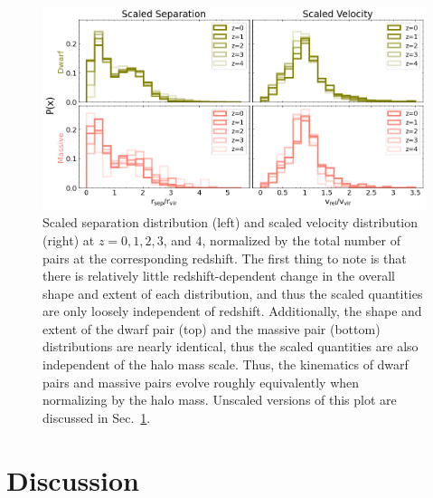 \documentclass[twocolumn]{aastex631}
\begin{document}
\begin{figure}[htp]
  \centering
  \includegraphics[width=\textwidth]{scaledcombodist_1000.png}
  \caption{Scaled separation distribution (left) and scaled velocity distribution (right) at $z=0,1,2,3$, and $4$, normalized by the total number of pairs at the corresponding redshift. 
  The first thing to note is that there is relatively little redshift-dependent change in the overall shape and extent of each distribution, and thus the scaled quantities are only loosely independent of redshift. 
  Additionally, the shape and extent of the dwarf pair (top) and the massive pair (bottom) distributions are nearly identical, thus the scaled quantities are also independent of the halo mass scale. Thus, the kinematics of dwarf pairs and massive pairs evolve roughly equivalently when normalizing by the halo mass.
  Unscaled versions of this plot are discussed in Sec.~\ref{sec:discussion}.
  }
  \label{fig:scaled-dist}
\end{figure} 


\section{Discussion}\label{sec:discussion}








\end{document}
